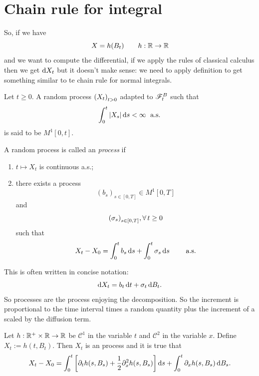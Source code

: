 \documentclass[12pt]{report}
\begin{document}
\section{Chain rule for \ito{} integral}
So, if we have 
\begin{equation*}
	X=h(B_{t})\qquad h:\mathbb{R}\to\mathbb{R}
\end{equation*}
and we want to compute the differential, if we apply the rules of classical calculus then we get $\mathop{}\!\mathrm{d} X_{t}$ but it doesn't make sense: we need to apply \ito{} definition to get something similar to te chain rule for normal integrals.
\begin{definition}
	Let $t\geq 0$. A random process ${\left({X}_{t}\right)}_{t>0}$ adapted to $\mathscr{F}^{B}_{t}$ such that \\
	\begin{equation*}
		\int_{0}^{t}|X_{s}|\mathop{}\!\mathrm{d} s<\infty\;\text{ a.s.}{}
	\end{equation*}
	is said to be \emph{$M^{1}[0,t]$}.
\end{definition}
\begin{definition}
	A random process is called an \emph{\ito{} process} if
	\begin{enumerate}
		\item $t\mapsto X_{t}$ is continuous a.s.;
		\item there exists a process 
		\begin{equation*}
			{(b_{s})}_{s\in[0,T]}\in M^{1}[0,T]
		\end{equation*}
		and
		\begin{equation*}
			{(\sigma_{s})}_{s\in[0,T]},\forall\, t\geq0
		\end{equation*}
		such that
		\begin{equation*}
			X_{t}-X_{0}=\int_{0}^{t}b_{s}\mathop{}\!\mathrm{d} s+\int_{0}^{t}\sigma_{s}\mathop{}\!\mathrm{d} s\qquad\text{ a.s.}{}
		\end{equation*}
	\end{enumerate}
\end{definition}
This is often written in concise notation: 
\begin{equation*}
	\mathop{}\!\mathrm{d} X_{t}=b_{t}\mathop{}\!\mathrm{d} t+\sigma_{t}\mathop{}\!\mathrm{d} B_{t}.
\end{equation*}
So \ito{} processes are the process enjoying the decomposition. So the increment is proportional to the time interval times a random quantity plus the increment of a \bwm{} scaled by the diffusion term.
\begin{theorem}
	Let $h:\mathbb{R}^{+}\times\mathbb{R}\to\mathbb{R}$ be $\mathcal{C}^{1}$ in the variable $t$ and $\mathcal{C}^{2}$ in the variable $x$. Define $X_{t}:=h(t,B_{t})$. Then $X_{t}$ is an \ito{} process and it is true that
	\begin{equation*}
		X_{t}-X_{0}=\int_{0}^{t}\left[\partial_{t}h(s,B_{s})+\frac{1}{2}\partial^{2}_{x} h(s,B_{s})\right]\mathop{}\!\mathrm{d} s+\int_{0}^{t}\partial_{x}h(s,B_{s})\mathop{}\!\mathrm{d} B_{s}.
	\end{equation*} 
\end{theorem}
\end{document}
